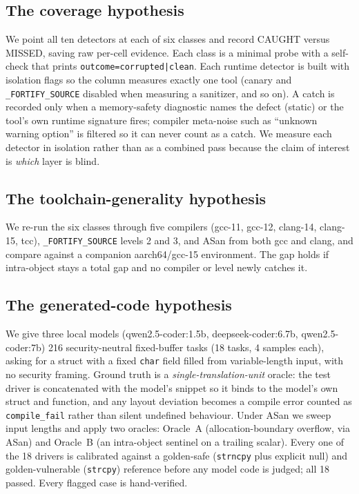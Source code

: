 \documentclass[11pt]{article}
\newcommand{\Ntotal}{216}
\begin{document}
\subsection*{The coverage hypothesis}
We point all ten detectors at each of six classes and record CAUGHT versus MISSED, saving
raw per-cell evidence. Each class is a minimal probe with a self-check that prints
\texttt{outcome=corrupted|clean}. Each runtime detector is built with isolation flags so the
column measures exactly one tool (canary and \texttt{\_FORTIFY\_SOURCE} disabled when
measuring a sanitizer, and so on). A catch is recorded only when a memory-safety diagnostic
names the defect (static) or the tool's own runtime signature fires; compiler meta-noise such
as ``unknown warning option'' is filtered so it can never count as a catch. We measure each
detector in isolation rather than as a combined pass because the claim of interest is
\emph{which} layer is blind.

\subsection*{The toolchain-generality hypothesis}
We re-run the six classes through five compilers (gcc-11, gcc-12, clang-14, clang-15, tcc),
\texttt{\_FORTIFY\_SOURCE} levels 2 and 3, and ASan from both gcc and clang, and compare
against a companion aarch64/gcc-15 environment. The gap holds if intra-object stays a total
gap and no compiler or level newly catches it.

\subsection*{The generated-code hypothesis}
We give three local models (qwen2.5-coder:1.5b, deepseek-coder:6.7b, qwen2.5-coder:7b)
\Ntotal{} security-neutral fixed-buffer tasks (18 tasks, 4 samples each), asking for a struct
with a fixed \texttt{char} field filled from variable-length input, with no security framing.
Ground truth is a \emph{single-translation-unit} oracle: the test driver is concatenated with
the model's snippet so it binds to the model's own struct and function, and any layout
deviation becomes a compile error counted as \texttt{compile\_fail} rather than silent
undefined behaviour. Under ASan we sweep input lengths and apply two oracles: Oracle~A
(allocation-boundary overflow, via ASan) and Oracle~B (an intra-object sentinel on a trailing
scalar). Every one of the 18 drivers is calibrated against a golden-safe (\texttt{strncpy}
plus explicit null) and golden-vulnerable (\texttt{strcpy}) reference before any model code is
judged; all 18 passed. Every flagged case is hand-verified.
\end{document}
